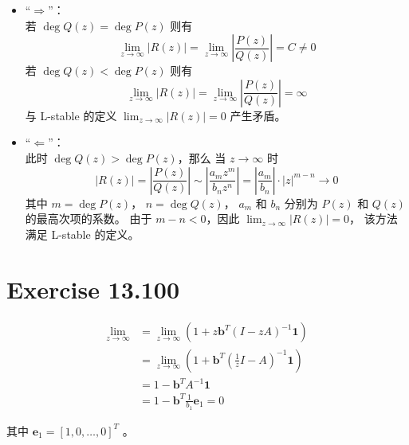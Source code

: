 \documentclass[a4paper]{article}
\begin{document}
\begin{itemize}
    \item “$\Rightarrow$”：\\
    若 $\deg Q(z) = \deg P(z)$ 则有
    \begin{equation}
        \lim_{z\to \infty} \left|R(z)\right| 
        = \lim_{z\to \infty} \left|
            \frac{P(z)}{Q(z)}
        \right|
        = C \neq 0
    \end{equation}
    若 $\deg Q(z) < \deg P(z)$ 则有
    \begin{equation}
        \lim_{z\to \infty} \left|R(z)\right| 
        = \lim_{z\to \infty} \left|
            \frac{P(z)}{Q(z)}
        \right|
        = \infty
    \end{equation}
    与 L-stable 的定义 $\displaystyle\lim_{z\to \infty} |R(z)| = 0$ 产生矛盾。
    \item “$\Leftarrow$”：\\
    此时 $\deg Q(z) > \deg P(z)$，那么
    当 $z \to \infty$ 时
    \begin{equation}
        \left|R(z)\right| 
        = \left|
            \frac{P(z)}{Q(z)}
        \right|
        \sim \left|
            \frac{a_m z^m}{b_n z^n}
        \right| = \left|\frac{a_m}{b_n}\right| \cdot \left|z\right|^{m-n}
        \to 0
    \end{equation}
    其中 $m = \deg P(z)$， $n = \deg Q(z)$， $a_m$ 和 $b_n$ 分别为 $P(z)$ 和 $Q(z)$ 的最高次项的系数。
    由于 $m - n < 0$，因此 $\displaystyle\lim_{z\to \infty} |R(z)| = 0$，
    该方法满足 L-stable 的定义。
\end{itemize}

\section*{Exercise 13.100}

\begin{equation}
    \begin{aligned}
        \lim_{z\to \infty} 
        &= \lim_{z\to \infty} \left(
            1+z\mathbf{b}^T\left(
                I-zA
            \right)^{-1}\mathbf{1}
        \right)\\
        &= \lim_{z\to \infty} \left(
            1+\mathbf{b}^T\left(
                \frac{1}{z}I-A
            \right)^{-1}\mathbf{1}
        \right)\\
        &=1-\mathbf{b}^TA^{-1}\mathbf{1}\\
        &=1-\mathbf{b}^T\frac{1}{b_1}\mathbf{e}_1=0
    \end{aligned}
\end{equation}
\par 其中 $\mathbf{e}_1 = [1, 0, \ldots, 0]^T$ 。
\end{document}
